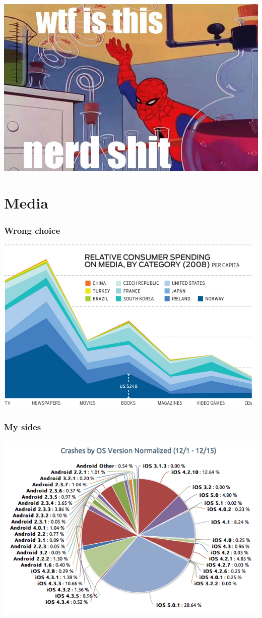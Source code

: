 \documentclass{beamer}
\begin{document}
\begin{frame}
  \includegraphics[width = \textwidth, keepaspectratio = true]{figure/nerd_shit}
\end{frame}

\section{Media}
\begin{frame}
  \frametitle{Wrong choice}
  \includegraphics[width = \textwidth, keepaspectratio = true]{figure/not_lines}
\end{frame}

\begin{frame}
  \frametitle{My sides}
  \includegraphics[width = \textwidth, keepaspectratio = true]{figure/android}
\end{frame}
\end{document}
